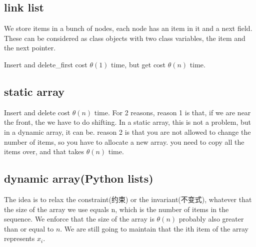 \documentclass[10.5pt,hyperref,a4paper,UTF8]{ctexart}
\begin{document}
\subsection{link list}
We store items in a bunch of nodes, each node has an item in it and a next field.
These can be considered as class objects with two class variables, the item and the next pointer.


Insert and delete\_first cost $\theta(1)$ time, but get cost $\theta(n)$ time.
\subsection{static array}
Insert and delete cost $\theta(n)$ time. For 2 reasons, reason 1 is that,
if we are near the front, the we have to do shifting. In a static array, this is not a problem, but in a dynamic array, it can be.
reason 2 is that you are not allowed to change the number of items, so you have to allocate a new array.
you need to copy all the items over, and that takes $\theta(n)$ time.

\subsection{dynamic array(Python lists)}
The idea is to relax the constraint(约束) or the invariant(不变式), 
whatever that the size of the array we use equals n, which is the number
of items in the sequence.
We enforce that the size of the array is $\theta(n)$ \-\- 
probably also greater than or equal to $n$.
We are still going to maintain that the ith item of the array represents $x_i$.
\end{document}
